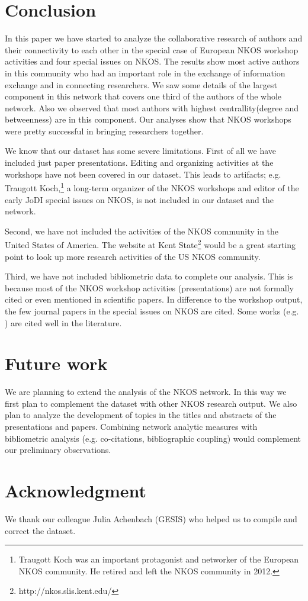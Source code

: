 \documentclass[runningheads,a4paper]{llncs}
\begin{document}
\section{Conclusion}\label{concl}
In this paper we have started to analyze the collaborative research of authors and their connectivity to each other in the special case of European NKOS workshop activities and four special issues on NKOS. The results show most active authors in this community who had an important role in the exchange of information exchange and in connecting researchers. We saw some details of the largest component in this network that covers one third of the authors of the whole network. Also we observed that most authors with highest centrallity(degree and betweenness) are in this component. Our analyses show that NKOS workshops were pretty successful in bringing researchers together.  


We know that our dataset has some severe limitations. 
First of all we have included just paper presentations. Editing and organizing activities at the workshops have not been covered in our dataset. This leads to artifacts; e.g. Traugott Koch,\footnote{Traugott Koch was an important protagonist and networker of the European NKOS community. He retired and left the NKOS community in 2012.} a long-term organizer of the NKOS workshops and editor of the early JoDI special issues on NKOS, is not included in our dataset and the network. 

Second, we have not included the activities of the NKOS community in the United States of America. The website at Kent State\footnote{http://nkos.slis.kent.edu/} would be a great starting point to look up more research activities of the US NKOS community.

Third, we have not included bibliometric data to complete our analysis. This is because most of the NKOS workshop activities (presentations) are not formally cited or even mentioned in scientific papers. In difference to the workshop output, the few journal papers in the special issues on NKOS are cited. Some works (e.g. \cite{SPCranefield2001,SPDoerr2001,SPTudhope2001,SPSoergel2004,SPTrant2006}) are cited well in the literature. 



\section{Future work}\label{future}
We are planning to extend the analysis of the NKOS network. In this way we first plan to complement the dataset with other NKOS research output. We also plan to analyze the development of topics in the titles and abstracts of the presentations and papers. Combining network analytic measures with bibliometric analysis (e.g. co-citations, bibliographic coupling) would complement our preliminary observations.

\section{Acknowledgment}\label{sec:ACKNOWLEDGMENTS}
We thank our colleague Julia Achenbach (GESIS) who helped us to compile and correct the dataset.

\newpage

 
\end{document}
